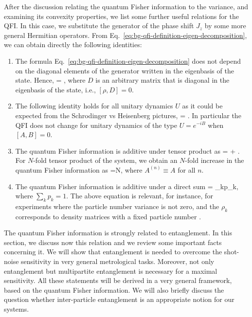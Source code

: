 After the discussion relating the quantum Fisher information to the variance, and examining its convexity properties, we list some further useful relations for the QFI.
In this case, we substitute the generator of the phase shift $J_z$ by some more general Hermitian operators.
From Eq.~\eqref{eq:bg-qfi-definition-eigen-decomposition}, we can obtain directly the following identities:
\begin{enumerate}
  \item The formula Eq.~\eqref{eq:bg-qfi-definition-eigen-decomposition} does not depend on the diagonal elements of the generator written in the eigenbasis of the state.
  Hence,
  \be
     = ,
  \ee
  where $D$ is an arbitrary matrix that is diagonal in the eigenbasis of the state, i.e., $[\rho,D]=0$.
  \item The following identity holds for all unitary dynamics $U$ as it could be expected from the Schrodinger vs Heisenberg pictures,
  \be
     = .
  \ee
  In particular the QFI does not change for unitary dynamics of the type $U=e^{-iB}$ when $[A,B]=0$.
  \item The quantum Fisher information is additive under tensor product as
  \be
     = + .
    \label{eq:bg-qfi-additive-for-tensor-product}
  \ee
  For $N$-fold tensor product of the system, we obtain an $N$-fold increase in the quantum Fisher information as
  \be
    =N,
  \ee
  where $A^{(n)}\equiv A$ for all $n$.
  \item The quantum Fisher information is additive under a direct sum \cite{Liu2014}
  \be
     = \sum_{k}p_k,
  \ee
  where $\sum_k p_k = 1$.
  The above equation is relevant, for instance, for experiments where the particle number variance is not zero, and the $\rho_k$ corresponds to density matrices with a fixed particle number \cite{Hyllus2010, Hyllus2012}.
\end{enumerate}


The quantum Fisher information is strongly related to entanglement.
In this section, we discuss now this relation and we review some important facts concerning it.
We will show that entanglement is needed to overcome the shot-noise sensitivity in very general metrological tasks.
Moreover, not only entanglement but multipartite entanglement is necessary for a maximal sensitivity.
All these statements will be derived in a very general framework, based on the quantum Fisher information.
We will also briefly discuss the question whether inter-particle entanglement is an appropriate notion for our systems.

